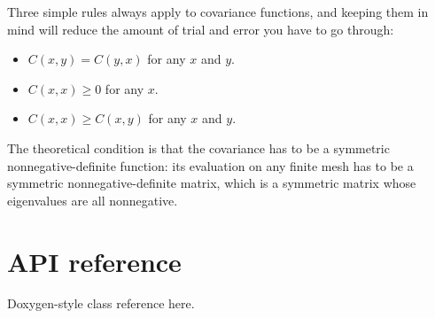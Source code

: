 \documentclass{manual}
\begin{document}
Three simple rules always apply to covariance functions, and keeping them in mind will reduce the amount of trial and error you have to go through:
\begin{itemize}
	\item $C(x,y)=C(y,x)$ for any $x$ and $y$.
	\item $C(x,x) \ge 0$ for any $x$.
	\item $C(x,x)\ge C(x,y)$ for any $x$ and $y$.
\end{itemize}

The theoretical condition is that the covariance has to be a symmetric nonnegative-definite function: its evaluation on any finite mesh has to be a symmetric nonnegative-definite matrix, which is a symmetric matrix whose eigenvalues are all nonnegative.



\chapter{API reference}\label{cha:reference} 

Doxygen-style class reference here.
\end{document}
